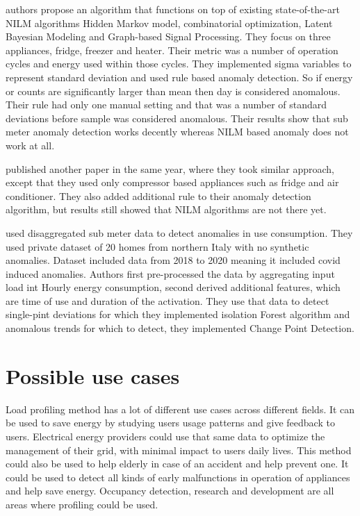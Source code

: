 \documentclass[
11pt, %
english, %
singlespacing, %
headsepline, %
]{MastersDoctoralThesis} %
\begin{document}
\cite{NILMAD2019} authors propose an algorithm
that functions on top of existing state-of-the-art NILM algorithms Hidden Markov model,
combinatorial optimization, Latent Bayesian Modeling and Graph-based Signal Processing.
They focus on three appliances, fridge, freezer and heater. Their metric was a number of operation cycles and energy used within those cycles. 
They implemented sigma variables to represent standard deviation and used rule based anomaly detection.
So if energy or counts are significantly larger than mean then day is considered anomalous.
Their rule had only one manual setting and that was a number of standard deviations before sample was considered anomalous.
Their results show that sub meter anomaly detection works decently whereas NILM based anomaly does not work at all. 

\cite{NILMAD22019} published another paper in the same year, where they took similar approach, except that they used 
only compressor based appliances such as fridge and air conditioner. They also added additional rule to their anomaly 
detection algorithm, but results still showed that NILM algorithms are not there yet. 

\cite{Castangia2021} used disaggregated sub meter data to detect anomalies in use consumption.
They used private dataset of 20 homes from northern Italy with no synthetic anomalies. 
Dataset included data from 2018 to 2020 meaning it included covid induced anomalies. 
Authors first pre-processed the data by aggregating input load int Hourly energy consumption, 
second derived additional features, which are time of use and duration of the activation.
They use that data to detect single-pint deviations for which they implemented isolation Forest algorithm and
anomalous trends for which to detect, they implemented Change Point Detection. 

\chapter{Possible use cases}

Load profiling method has a lot of different use cases across different fields.
It can be used to save energy by studying users usage patterns and give feedback to users.
Electrical energy providers could use that same data to optimize the management of their grid, with minimal impact to users daily lives.
This method could also be used to help elderly in case of an accident and help prevent one. 
It could be used to detect all kinds of early malfunctions in operation of appliances and help save energy.
Occupancy detection, research and development are all areas where profiling could be used. 
\end{document}
